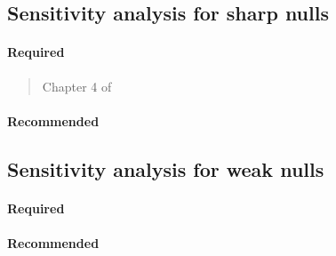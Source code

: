 \documentclass[12pt]{article}
\begin{document}
\begin{verse}  \end{verse}

\subsection{Sensitivity analysis for sharp nulls}

\paragraph*{Required}

\begin{verse} Chapter 4 of  \end{verse}

\begin{verse}  \end{verse}

\paragraph*{Recommended}

\begin{verse}  \end{verse}

\begin{verse}  \end{verse}

\subsection{Sensitivity analysis for weak nulls}

\paragraph*{Required}

\begin{verse}  \end{verse}

\paragraph*{Recommended}

\begin{verse}  \end{verse}
\end{document}
